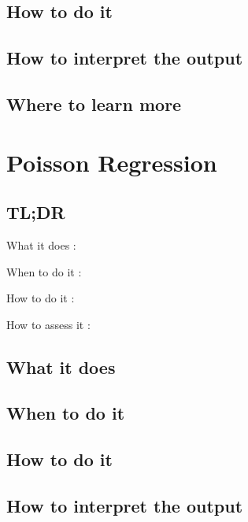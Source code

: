 \documentclass[
]{book}
\begin{document}
\hypertarget{how-to-do-it-7}{%
\section{How to do it}\label{how-to-do-it-7}}

\hypertarget{how-to-interpret-the-output-7}{%
\section{How to interpret the output}\label{how-to-interpret-the-output-7}}

\hypertarget{where-to-learn-more-7}{%
\section{Where to learn more}\label{where-to-learn-more-7}}

\hypertarget{poisson-regression}{%
\chapter{Poisson Regression}\label{poisson-regression}}

\hypertarget{tldr-8}{%
\section{TL;DR}\label{tldr-8}}

What it does
:

When to do it
:

How to do it
:

How to assess it
:

\hypertarget{what-it-does-8}{%
\section{What it does}\label{what-it-does-8}}

\hypertarget{when-to-do-it-8}{%
\section{When to do it}\label{when-to-do-it-8}}

\hypertarget{how-to-do-it-8}{%
\section{How to do it}\label{how-to-do-it-8}}

\hypertarget{how-to-interpret-the-output-8}{%
\section{How to interpret the output}\label{how-to-interpret-the-output-8}}
\end{document}
